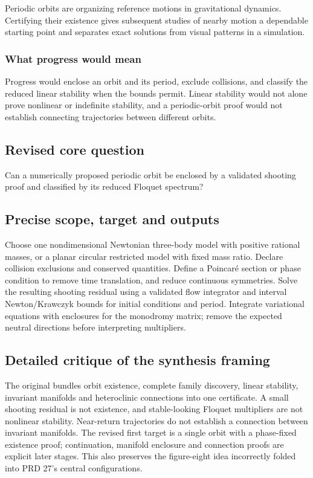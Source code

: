\documentclass[
  11pt,
]{article}
\begin{document}
Periodic orbits are organizing reference motions in gravitational
dynamics. Certifying their existence gives subsequent studies of nearby
motion a dependable starting point and separates exact solutions from
visual patterns in a simulation.

\subsubsection{What progress would mean}

Progress would enclose an orbit and its period, exclude collisions, and
classify the reduced linear stability when the bounds permit. Linear
stability would not alone prove nonlinear or indefinite stability, and a
periodic-orbit proof would not establish connecting trajectories between
different orbits.

\subsection{Revised core question}

Can a numerically proposed periodic orbit be enclosed by a validated
shooting proof and classified by its reduced Floquet spectrum?

\subsection{Precise scope, target and outputs}

Choose one nondimensional Newtonian three-body model with positive
rational masses, or a planar circular restricted model with fixed mass
ratio. Declare collision exclusions and conserved quantities. Define a
Poincaré section or phase condition to remove time translation, and
reduce continuous symmetries. Solve the resulting shooting residual
using a validated flow integrator and interval Newton/Krawczyk bounds
for initial conditions and period. Integrate variational equations with
enclosures for the monodromy matrix; remove the expected neutral
directions before interpreting multipliers.

\subsection{Detailed critique of the synthesis framing}

The original bundles orbit existence, complete family discovery, linear
stability, invariant manifolds and heteroclinic connections into one
certificate. A small shooting residual is not existence, and
stable-looking Floquet multipliers are not nonlinear stability.
Near-return trajectories do not establish a connection between invariant
manifolds. The revised first target is a single orbit with a phase-fixed
existence proof; continuation, manifold enclosure and connection proofs
are explicit later stages. This also preserves the figure-eight idea
incorrectly folded into PRD 27's central configurations.
\end{document}
